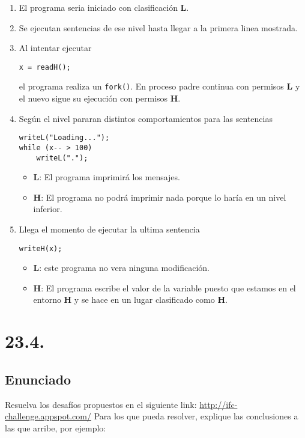 \documentclass[11pt]{article}
\begin{document}
\begin{enumerate}
    \item El programa seria iniciado con clasificación \textbf{L}.
    \item Se ejecutan sentencias de ese nivel hasta llegar a la primera linea mostrada.
    \item Al intentar ejecutar
\begin{lstlisting}
x = readH();
\end{lstlisting}
    el programa realiza un \texttt{fork()}. En proceso padre continua con permisos \textbf{L} y el nuevo sigue su ejecución con permisos \textbf{H}. 
    \item Según el nivel pararan distintos comportamientos para las sentencias
\begin{lstlisting}
writeL("Loading...");
while (x-- > 100)
    writeL(".");
\end{lstlisting}
    \begin{itemize}
        \item \textbf{L}: El programa imprimirá los mensajes.
        \item \textbf{H}: El programa no podrá imprimir nada porque lo haría en un nivel inferior.
    \end{itemize}
    \item Llega el momento de ejecutar la ultima sentencia 
\begin{lstlisting}
writeH(x);
\end{lstlisting}
    \begin{itemize}
        \item \textbf{L}: este programa no vera ninguna modificación.
        \item \textbf{H}: El programa escribe el valor de la variable puesto que estamos en el entorno \textbf{H} y se hace en un lugar clasificado como \textbf{H}.
    \end{itemize}
\end{enumerate}


\section*{23.4. }
\subsection*{Enunciado}

Resuelva los desafíos propuestos en el siguiente link: \url{http://ifc-challenge.appspot.com/} Para los que pueda resolver, explique las conclusiones a las que arribe, por ejemplo:
\end{document}
